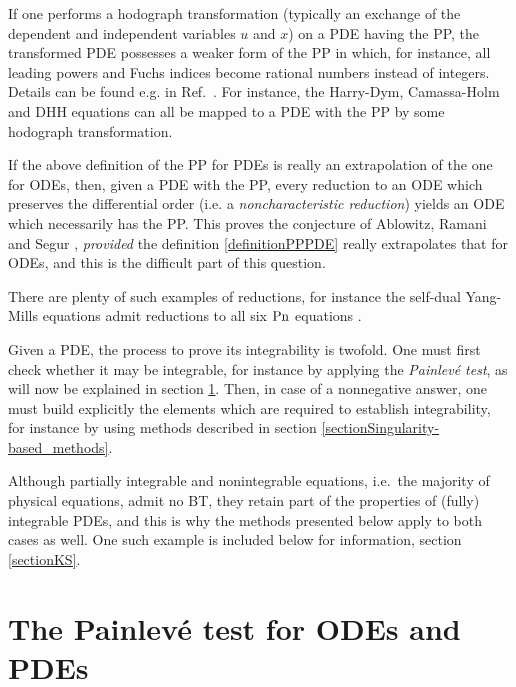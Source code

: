 \documentclass[10pt]{article}
\begin{document}
If one performs a hodograph transformation
(typically an exchange of the dependent and independent variables $u$ and $x$)
on a PDE having the PP,
the transformed PDE possesses a weaker form of the PP in which,
for instance, all leading powers and Fuchs indices become rational numbers
instead of integers.
Details can be found e.g. in Ref.~\cite{CFA}.
For instance, the Harry-Dym, Camassa-Holm \cite{CH1993}
and DHH equations \cite{DHH} can all be mapped to a PDE with the PP
by some hodograph transformation.

If the above definition of the PP for PDEs 
is really an extrapolation of the one for ODEs, 
then, given a PDE with the PP,
every reduction to an ODE which preserves the differential order
(i.e. a \textit{noncharacteristic reduction})
yields an ODE which necessarily has the PP.
This proves the conjecture of Ablowitz, Ramani and Segur \cite{ARS1980},
\textit{provided} the definition \ref{definitionPPPDE} 
really extrapolates that for ODEs, 
and this is the difficult part of this question.

There are plenty of such examples of reductions,
for instance the self-dual Yang-Mills equations
admit reductions to all six ${\rm Pn}$ equations \cite{MW1993}.

Given a PDE, the process to prove its integrability is twofold.
One must first check whether it may be integrable,
for instance by applying the \textit{Painlev\'e test}, 
as will now be explained in section \ref{sectionPTest}.
Then, in case of a nonnegative answer,
one must build explicitly the elements which are required to establish 
integrability,
for instance by using methods described in section
\ref{sectionSingularity-based_methods}.

Although partially integrable and nonintegrable equations,
i.e.~the majority of physical equations,
admit no BT, they retain part of the properties of (fully) integrable PDEs,
and this is why the methods presented below apply to both cases as well.
One such example is included below for information, 
section \ref{sectionKS}.

\section{The Painlev\'e test for ODEs and PDEs}
\label{sectionPTest}

\end{document}
